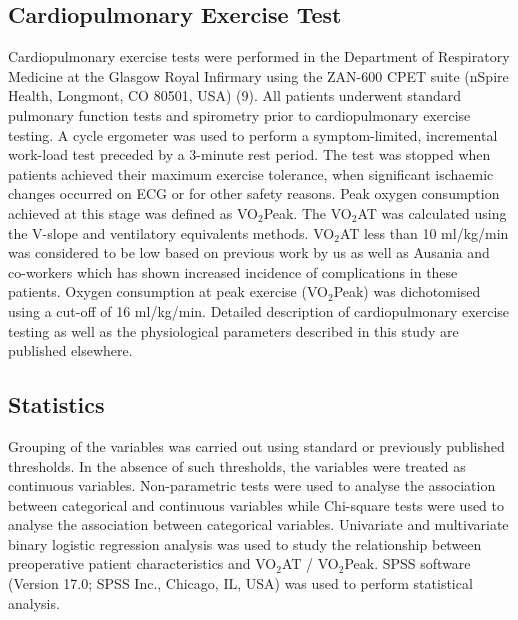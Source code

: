 \subsection{Cardiopulmonary Exercise Test}
Cardiopulmonary exercise tests were performed in the Department of Respiratory Medicine at the Glasgow Royal Infirmary using the ZAN-600 CPET suite (nSpire Health, Longmont, CO 80501, USA) (9). All patients underwent standard pulmonary function tests and spirometry prior to cardiopulmonary exercise testing. A cycle ergometer was used to perform a symptom-limited, incremental work-load test preceded by a 3-minute rest period. The test was stopped when patients achieved their maximum exercise tolerance, when significant ischaemic changes occurred on ECG or for other safety reasons. Peak oxygen consumption achieved at this stage was defined as VO$_2$Peak. The VO$_2$AT was calculated using the V-slope\parencite{beaver_new_1986,sue_metabolic_1988} and ventilatory equivalents\parencite{society_ats/accp_2003} methods. VO$_2$AT less than 10 ml/kg/min was considered to be low based on previous work by us\parencite{chandrabalan_pre-operative_2013} as well as Ausania and co-workers\parencite{ausania_effects_2012} which has shown increased incidence of complications in these patients. Oxygen consumption at peak exercise (VO$_2$Peak) was dichotomised using a cut-off of 16 ml/kg/min. Detailed description of cardiopulmonary exercise testing as well as the physiological parameters described in this study are published elsewhere.\parencite{balady_clinicians_2010}

\subsection{Statistics}
Grouping of the variables was carried out using standard or previously published thresholds. In the absence of such thresholds, the variables were treated as continuous variables. Non-parametric tests were used to analyse the association between categorical and continuous variables while Chi-square tests were used to analyse the association between categorical variables. Univariate and multivariate binary logistic regression analysis was used to study the relationship between preoperative patient characteristics and VO$_2$AT / VO$_2$Peak. SPSS software (Version 17.0; SPSS Inc., Chicago, IL, USA) was used to perform statistical analysis.

\clearpage

